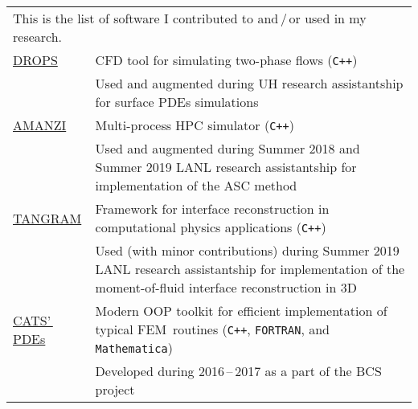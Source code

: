 \documentclass[a4paper,12pt]{article}
\begin{document}
	\begin{longtable}{ l >{\raggedright\arraybackslash}p{15cm} }
		\multicolumn{2}{p{17cm}}{This is the list of software I contributed to and\,/\,or used in my research.}\vspace{3mm}\\
		\href{https://www.igpm.rwth-aachen.de/DROPS/}{DROPS}
			& CFD tool for simulating two-phase flows (\texttt{C++})\vspace{1mm}\\
			& Used and augmented during UH research assistantship for surface PDEs simulations\vspace{3mm}\\
		\href{https://github.com/amanzi}{AMANZI}
			& Multi-process HPC simulator (\texttt{C++})\vspace{1mm}\\
			& Used and augmented during Summer 2018 and Summer 2019 LANL research assistantship for implementation of the ASC method\vspace{3mm}\\
		\href{https://github.com/laristra/tangram}{TANGRAM}
			& Framework for interface reconstruction in computational physics applications (\texttt{C++})\vspace{1mm}\\
			& Used (with minor contributions) during Summer 2019 LANL research assistantship for implementation of the moment-of-fluid interface reconstruction in 3D\vspace{3mm}\\
		\href{https://github.com/CATSPDEs/}{CATS'\,PDEs}
			& Modern OOP toolkit for efficient implementation of typical FEM~routines (\texttt{C++}, \texttt{FORTRAN}, and \texttt{Mathematica})\vspace{1mm}\\
			& Developed during 2016\,--\,2017 as a part of the BCS project
	\end{longtable}
	
	\vfill
	
	\centering\footnotesize{}
		
\end{document}
